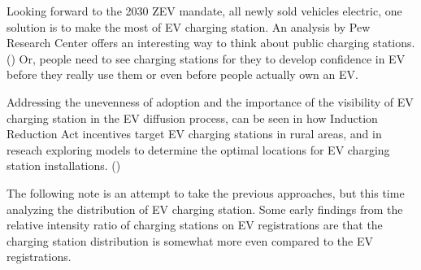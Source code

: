 \documentclass[
  letterpaper,
  DIV=11,
  numbers=noendperiod]{scrartcl}
\begin{document}
Looking forward to the 2030 ZEV mandate, all newly sold vehicles
electric, one solution is to make the most of EV charging station. An
analysis by Pew Research Center offers an interesting way to think about
public charging
stations.() Or,
people need to see charging stations for they to develop confidence in
EV before they really use them or even before people actually own an EV.

Addressing the unevenness of adoption and the importance of the
visibility of EV charging station in the EV diffusion process, can be
seen in how Induction Reduction Act incentives target EV charging
stations in rural areas, and in reseach exploring models to determine
the optimal locations for EV charging station installations.
()

The following note is an attempt to take the previous approaches, but
this time analyzing the distribution of EV charging station. Some early
findings from the relative intensity ratio of charging stations on EV
registrations are that the charging station distribution is somewhat
more even compared to the EV registrations.
\end{document}
